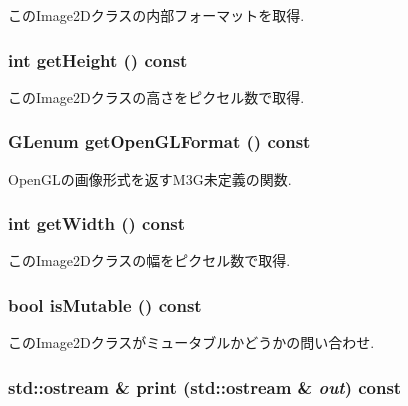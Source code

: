 このImage2Dクラスの内部フォーマットを取得. \hypertarget{classm3g_1_1Image2D_317329daf960a1759801c0f16d43d5a3}{
\subsubsection[{getHeight}]{\setlength{\rightskip}{0pt plus 5cm}int getHeight () const}}
\label{classm3g_1_1Image2D_317329daf960a1759801c0f16d43d5a3}


このImage2Dクラスの高さをピクセル数で取得. \hypertarget{classm3g_1_1Image2D_7923da2fe82fee768ec9937a693e843c}{
\subsubsection[{getOpenGLFormat}]{\setlength{\rightskip}{0pt plus 5cm}GLenum getOpenGLFormat () const}}
\label{classm3g_1_1Image2D_7923da2fe82fee768ec9937a693e843c}


OpenGLの画像形式を返すM3G未定義の関数. \hypertarget{classm3g_1_1Image2D_f149cb053bc8b5fbc1364b5dbb934488}{
\subsubsection[{getWidth}]{\setlength{\rightskip}{0pt plus 5cm}int getWidth () const}}
\label{classm3g_1_1Image2D_f149cb053bc8b5fbc1364b5dbb934488}


このImage2Dクラスの幅をピクセル数で取得. \hypertarget{classm3g_1_1Image2D_d687aabba553d1c66bfc253ec7e5bd05}{
\subsubsection[{isMutable}]{\setlength{\rightskip}{0pt plus 5cm}bool isMutable () const}}
\label{classm3g_1_1Image2D_d687aabba553d1c66bfc253ec7e5bd05}


このImage2Dクラスがミュータブルかどうかの問い合わせ. \hypertarget{classm3g_1_1Image2D_6fea17fa1532df3794f8cb39cb4f911f}{
\subsubsection[{print}]{\setlength{\rightskip}{0pt plus 5cm}std::ostream \& print (std::ostream \& {\em out}) const}}
\label{classm3g_1_1Image2D_6fea17fa1532df3794f8cb39cb4f911f}


